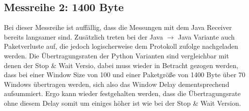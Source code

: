 \documentclass{article}
\begin{document}
    \subsection{Messreihe 2: 1400 Byte}
    Bei dieser Messreihe ist auffällig, dass die Messungen mit dem Java Receiver bereits langsamer sind.
    Zusätzlich treten bei der Java $\rightarrow$ Java Variante auch Paketverluste auf, die jedoch logischerweise
    dem Protokoll zufolge nachgeladen werden.
    Die Übertragungsraten der Python Varianten sind vergleichbar mit denen der Stop \& Wait Versio, dabei muss wieder
    in Betracht gezogen werden, dass bei einer Window Size von 100 und einer Paketgröße von 1400 Byte über
    70 Windows übertragen werden, sich also das Window Delay dementsprechend aufsummiert.
    Ergo kann wieder festgehalten werden, dass die Übertragungsrate ohne diesem Delay somit um einiges höher ist
    wie bei der Stop \& Wait Version.
\end{document}
